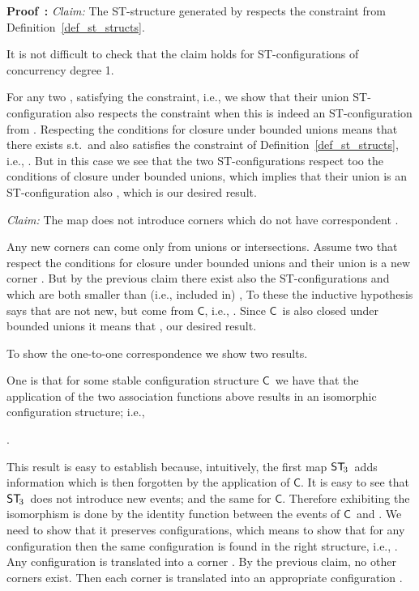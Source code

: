\documentclass[submission,copyright,creativecommons]{eptcs}
\newenvironment{proof}[1][\!\!\,]{\vspace{1ex}\noindent\textbf{Proof #1: }}{\hfill\vspace{2ex}}
\newcounter{case}
\newcommand\C{\ensuremath{\mathsf{C}}}
\newcommand\cintostThird{\ensuremath{\mathsf{ST}_{\hspace{-0.4ex}3}}}
\newcommand\stintoc{\ensuremath{\mathsf{C}}}
\begin{document}
\begin{proof}
\vspace{1ex}
\noindent\textit{Claim:}\hspace{1ex} The ST-structure generated by  respects the constraint from Definition~\ref{def_st_structs}.

\vspace{1ex}
It is not difficult to check that the claim holds for ST-configurations of concurrency degree 1. 

For any two ,  satisfying the constraint, i.e.,  we show that their union ST-configuration also respects the constraint when this is indeed an ST-configuration from . 
Respecting the conditions for closure under bounded unions means that there exists  s.t.\  and  also satisfies the constraint of Definition~\ref{def_st_structs}, i.e., . But in this case we see that the two ST-configurations  respect too the conditions of closure under bounded unions, which implies that their union is an ST-configuration also , which is our desired result.


\vspace{1ex}
\noindent\textit{Claim:}\hspace{1ex} The map  does not introduce corners  which do not have correspondent .
\vspace{0.5ex}

Any new corners can come only from unions or intersections. Assume two  that respect the conditions for closure under bounded unions and their union is a new corner . But by the previous claim there exist also the ST-configurations  and  which are both smaller than (i.e., included in) , To these the inductive hypothesis says that are not new, but come from \C, i.e., . Since \C\ is also closed under bounded unions it means that , our desired result.

\vspace{1ex}
To show the one-to-one correspondence we show two results.

One is that for some stable configuration structure \C\ we have that the application of the two association functions above results in an isomorphic configuration structure; i.e., 

\centerline{.}

This result is easy to establish because, intuitively, the first map \cintostThird\ adds information which is then forgotten by the application of \C. It is easy to see that \cintostThird\ does not introduce new events; and the same for \stintoc. Therefore exhibiting the isomorphism is done by the identity function between the events of \stintoc\ and . We need to show that it preserves configurations, which means to show that for any configuration  then the same configuration is found in the right structure, i.e., . Any configuration is translated into a corner . By the previous claim, no other corners exist. Then each corner is translated into an appropriate configuration .


\end{proof}
\end{document}
